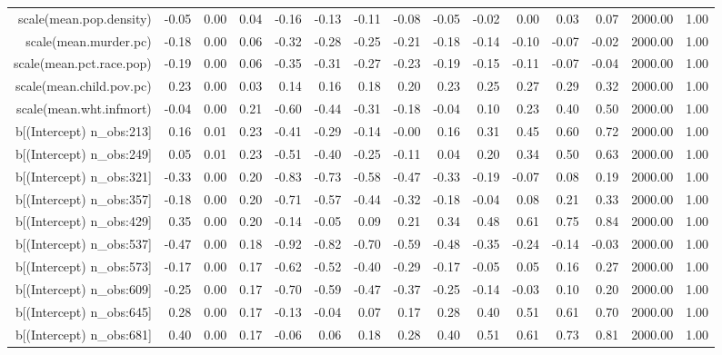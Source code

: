 \begin{table}[ht]
\begin{tabular}{rrrrrrrrrrrrrrr}
  scale(mean.pop.density) & -0.05 & 0.00 & 0.04 & -0.16 & -0.13 & -0.11 & -0.08 & -0.05 & -0.02 & 0.00 & 0.03 & 0.07 & 2000.00 & 1.00 \\ 
  scale(mean.murder.pc) & -0.18 & 0.00 & 0.06 & -0.32 & -0.28 & -0.25 & -0.21 & -0.18 & -0.14 & -0.10 & -0.07 & -0.02 & 2000.00 & 1.00 \\ 
  scale(mean.pct.race.pop) & -0.19 & 0.00 & 0.06 & -0.35 & -0.31 & -0.27 & -0.23 & -0.19 & -0.15 & -0.11 & -0.07 & -0.04 & 2000.00 & 1.00 \\ 
  scale(mean.child.pov.pc) & 0.23 & 0.00 & 0.03 & 0.14 & 0.16 & 0.18 & 0.20 & 0.23 & 0.25 & 0.27 & 0.29 & 0.32 & 2000.00 & 1.00 \\ 
  scale(mean.wht.infmort) & -0.04 & 0.00 & 0.21 & -0.60 & -0.44 & -0.31 & -0.18 & -0.04 & 0.10 & 0.23 & 0.40 & 0.50 & 2000.00 & 1.00 \\ 
  b[(Intercept) n\_obs:213] & 0.16 & 0.01 & 0.23 & -0.41 & -0.29 & -0.14 & -0.00 & 0.16 & 0.31 & 0.45 & 0.60 & 0.72 & 2000.00 & 1.00 \\ 
  b[(Intercept) n\_obs:249] & 0.05 & 0.01 & 0.23 & -0.51 & -0.40 & -0.25 & -0.11 & 0.04 & 0.20 & 0.34 & 0.50 & 0.63 & 2000.00 & 1.00 \\ 
  b[(Intercept) n\_obs:321] & -0.33 & 0.00 & 0.20 & -0.83 & -0.73 & -0.58 & -0.47 & -0.33 & -0.19 & -0.07 & 0.08 & 0.19 & 2000.00 & 1.00 \\ 
  b[(Intercept) n\_obs:357] & -0.18 & 0.00 & 0.20 & -0.71 & -0.57 & -0.44 & -0.32 & -0.18 & -0.04 & 0.08 & 0.21 & 0.33 & 2000.00 & 1.00 \\ 
  b[(Intercept) n\_obs:429] & 0.35 & 0.00 & 0.20 & -0.14 & -0.05 & 0.09 & 0.21 & 0.34 & 0.48 & 0.61 & 0.75 & 0.84 & 2000.00 & 1.00 \\ 
  b[(Intercept) n\_obs:537] & -0.47 & 0.00 & 0.18 & -0.92 & -0.82 & -0.70 & -0.59 & -0.48 & -0.35 & -0.24 & -0.14 & -0.03 & 2000.00 & 1.00 \\ 
  b[(Intercept) n\_obs:573] & -0.17 & 0.00 & 0.17 & -0.62 & -0.52 & -0.40 & -0.29 & -0.17 & -0.05 & 0.05 & 0.16 & 0.27 & 2000.00 & 1.00 \\ 
  b[(Intercept) n\_obs:609] & -0.25 & 0.00 & 0.17 & -0.70 & -0.59 & -0.47 & -0.37 & -0.25 & -0.14 & -0.03 & 0.10 & 0.20 & 2000.00 & 1.00 \\ 
  b[(Intercept) n\_obs:645] & 0.28 & 0.00 & 0.17 & -0.13 & -0.04 & 0.07 & 0.17 & 0.28 & 0.40 & 0.51 & 0.61 & 0.70 & 2000.00 & 1.00 \\ 
  b[(Intercept) n\_obs:681] & 0.40 & 0.00 & 0.17 & -0.06 & 0.06 & 0.18 & 0.28 & 0.40 & 0.51 & 0.61 & 0.73 & 0.81 & 2000.00 & 1.00 \\ 

\end{tabular}
\end{table}
